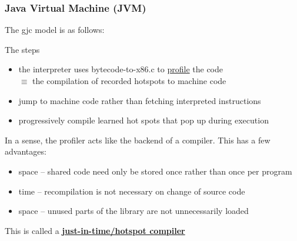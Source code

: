 \documentclass[../../lecture_notes.tex]{subfiles}
\begin{document}
\subsubsection*{Java Virtual Machine (JVM)}
The gjc model is as follows:\\
\noindent The steps \begin{itemize} [itemsep=0mm]
	\item the interpreter uses bytecode-to-x86.c to \underline{profile} the code\\
		$\equiv$ the compilation of recorded hotspots to machine code
	\item jump to machine code rather than fetching interpreted instructions
	\item progressively compile learned hot spots that pop up during execution
	\end{itemize}
In a sense, the profiler acts like the backend of a compiler.
This has a few advantages: \begin{itemize} [itemsep=0mm]
	\item space -- shared code need only be stored once rather than once per program
	\item time -- recompilation is not necessary on change of source code
	\item space -- unused parts of the library are not unnecessarily loaded
	\end{itemize}
This is called a \textbf{\underline{just-in-time/hotspot compiler}}\\
\\
\end{document}
